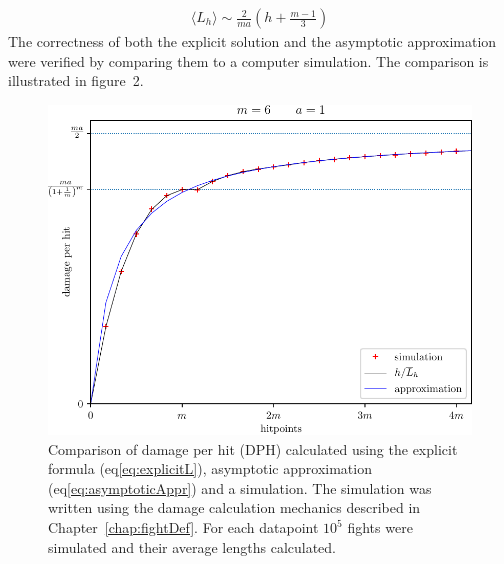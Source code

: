 \begin{align}\label{eq:asymptoticAppr}
\langle L_h \rangle \sim \frac{2}{ma}\left(h + \frac{m-1}{3}\right)
\end{align}
The correctness of both the explicit solution and the asymptotic approximation were verified by comparing them to a computer simulation. The comparison is illustrated in figure~2.
\begin{figure}[t]\label{fig:apprComparison}
    \includegraphics[scale=1.1]{dph-appr-m6.pdf}
    \caption{Comparison of damage per hit (DPH) calculated using the explicit formula (eq\ref{eq:explicitL}), asymptotic approximation (eq\ref{eq:asymptoticAppr}) and a simulation. The simulation was written using the damage calculation mechanics described in Chapter~\ref{chap:fightDef}. For each datapoint $10^{5}$ fights were simulated and their average lengths calculated.}
\end{figure}
